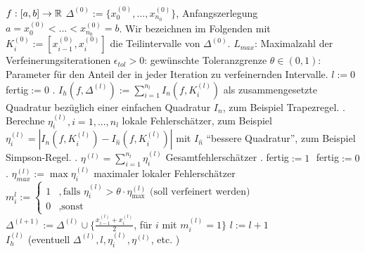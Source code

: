 \documentclass[
]{mycourse}
\begin{document}
\begin{alg*}
	\begin{algorithmic}
		\Require $f:[a,b]\to \mathbb{R}$
		\Require $\Delta^{(0)}:=\{x_0^{(0)},..., x_{n_0}^{(0)}\}$, Anfangszerlegung $a=x_0^{(0)}<...<x_{n_0}^{(0)}=b$. 
		Wir bezeichnen im Folgenden mit $K_i^{(0)}:=[x_{i-1}^{(0)}, x_{i}^{(0)}]$ die Teilintervalle von $\Delta^{(0)}$.
		\Require $L_{max}$: Maximalzahl der Verfeinerungsiterationen
		\Require $\epsilon_{tol}>0$: gewünschte Toleranzgrenze
		\Require $\theta\in (0,1)$: Parameter für den Anteil der in jeder Iteration zu verfeinernden Intervalle.
		\State $l:=0$
		\State fertig$:= 0$ %
		. $I_h(f, \Delta^{(l)}):= \sum_{i=1}^{n_l} I_n (f, K_{i}^{(l)})$ als zusammengesetzte Quadratur bezüglich einer einfachen Quadratur $I_n$, zum Beispiel Trapezregel.
		. Berechne $\eta_i^{(l)}, i=1,..., n_l$ lokale Fehlerschätzer, zum Beispiel $\eta_i^{(l)}=|I_n(f, K_i^{(l)})- I_{\hat n} (f, K_i^{(l)})|$ mit $I_{\hat n}$ "`bessere Quadratur"', zum Beispiel Simpson-Regel.
		. $\eta^{(l)}=\sum_{i=1}^{n_l} \eta_i^{(l)}$ Gesamtfehlerschätzer
		.
		 fertig$:= 1$ \Else $ $ fertig$:= 0$ \EndIf
		. 
		\State $\eta_{max}^{(l)}:= \max \eta_i^{(l)}$ maximaler lokaler Fehlerschätzer
		\State $m_i^{l}:=\begin{cases} 1 &, \text{falls $\eta_i^{(l)}>\theta \cdot \eta_{\max}^{(l)}$ (soll verfeinert werden)}\\ 0 &, \text{sonst}\end{cases}$
		\State $\Delta^{(l+1)}:= \Delta^{(l)} \cup \{ \frac{x_{i-1}^{(l)}+x_{i}^{(l)}}{2}$, für $i$ mit $m_i^{(l)}=1\}$
		\State $l:=l+1$
		\EndIf 
		\EndWhile  \\
		\Return $I_h^{(l)}$ (eventuell $\Delta^{(l)}, l, \eta_i^{(l)}, \eta^{(l)}$, etc. )
	\end{algorithmic}
\end{alg*}
\end{document}

